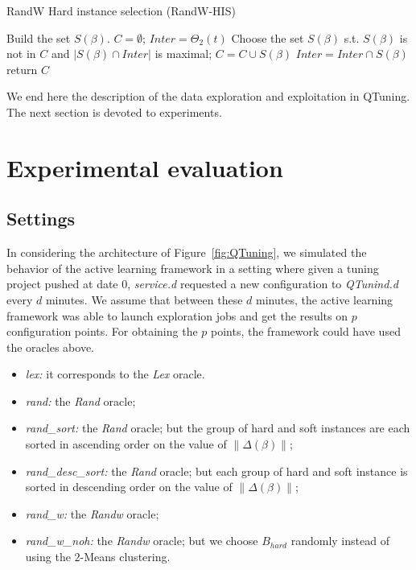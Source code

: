 \documentclass[10pt, conference, compsocconf]{IEEEtran}
\newcommand{\norm}[1]{\left\lVert#1\right\rVert}
\begin{document}
	\begin{algorithm}                    
	\caption{\scriptsize RandW Hard instance selection (RandW-HIS)} 	\label{alg4}  
	\begin{algorithmic}[1]
	\scriptsize
	\STATE Build the set $S(\beta)$.
	\ENDFOR
	\STATE $C = \emptyset$; $Inter = \Theta_2(t)$
		\STATE Choose the set $S(\beta)$ s.t. $S(\beta)$ is not in $C$ and $|S(\beta) \cap Inter|$ is maximal;
		\STATE $C  = C \cup S(\beta)$
                \STATE $Inter = Inter \cap S(\beta)$
	\ENDWHILE
	\STATE return $C$
	\end{algorithmic}
	\end{algorithm}
	\normalsize

We end here the description of the data exploration and exploitation in QTuning. The next section is devoted to experiments.


\section{Experimental evaluation} \label{Proof-of-concept}

\subsection{Settings}
In considering the architecture of Figure~\ref{fig:QTuning}, we simulated the behavior of 
the active learning framework in a setting where given a tuning project pushed at date $0$,  
{\it service.d} requested a new configuration to {\it QTunind.d} every $d$ minutes. 
We assume that between these $d$ minutes, the active learning framework was able to launch exploration 
jobs and get the results on $p$ configuration points. For obtaining the $p$ points, the framework 
could have used the oracles above.
\begin{itemize}
\item {\it lex:} it corresponds to the {\it Lex} oracle.
\item {\it rand:} the {\it Rand} oracle;
\item {\it rand\_sort:} the {\it Rand} oracle; but the group of hard and soft instances are each sorted in ascending order on the value of $\norm{\Delta(\beta)}$;
\item {\it rand\_desc\_sort:} the {\it Rand} oracle; but each group of hard and soft instance is sorted in descending order on the value of $\norm{\Delta(\beta)}$;
\item {\it rand\_w:} the {\it Randw} oracle;
\item {\it rand\_w\_noh:} the {\it Randw} oracle; but we choose $B_{hard}$ randomly instead of using the $2$-Means clustering.
\end{itemize}
\end{document}
